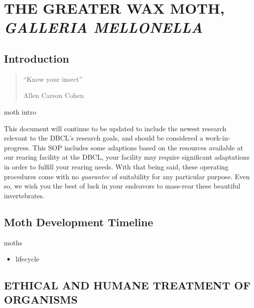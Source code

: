 \documentclass{sop_class}[overrideChapters] %
\providecommand{\tightlist}{%
  \setlength{\itemsep}{0pt}\setlength{\parskip}{0pt}}
\begin{document}
\let\realSingleSpace\relax
    {\hypertarget{crw}{%
\chapter{\texorpdfstring{THE GREATER WAX MOTH, \emph{GALLERIA MELLONELLA}}{THE GREATER WAX MOTH, GALLERIA MELLONELLA}}\label{crw}}

\hypertarget{introduction}{%
\section{Introduction}\label{introduction}}
\begin{quote}
``Know your insect''

\textemdash Allen Carson Cohen
\end{quote}
moth intro

This document will continue to be updated to include the newest research relevant to the DBCL's research goals, and should be considered a work-in-progress. This SOP includes some adaptions based on the resources available at our rearing facility at the DBCL, your facility may require significant adaptations in order to fulfill your rearing needs. With that being said, these operating procedures come with no \emph{guarantee} of suitability for any particular purpose. Even so, we wish you the best of luck in your endeavors to mass-rear these beautiful invertebrates.

\newpage \clearpage

\hypertarget{moth-timeline}{%
\section{Moth Development Timeline}\label{moth-timeline}}

moths
\begin{itemize}
\tightlist
\item
  lifecycle
\end{itemize}
\hypertarget{ethics}{%
\section{ETHICAL AND HUMANE TREATMENT OF ORGANISMS}\label{ethics}}

}
\end{document}
